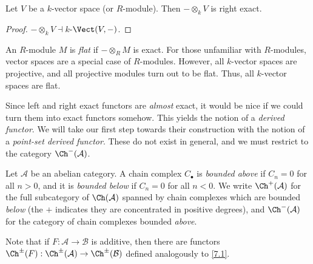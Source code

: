 \begin{corollary}\label{7.8}
	Let $V$ be a $k$-vector space (or $R$-module). Then $-\otimes_kV$ is right exact.
\end{corollary}
\begin{proof}
	$-\otimes_k V \dashv k$-$\Vect(V,-)$.
\end{proof}

\begin{remark}\label{7.9}
	An $R$-module $M$ is \emph{flat} if $-\otimes_RM$ is exact. For those unfamiliar with $R$-modules, vector spaces are a special case of $R$-modules. However, all $k$-vector spaces are projective, and all projective modules turn out to be flat. Thus, all $k$-vector spaces are flat.
\end{remark}

Since left and right exact functors are \emph{almost} exact, it would be nice if we could turn them into exact functors somehow. This yields the notion of a \emph{derived functor}. We will take our first step towards their construction with the notion of a \emph{point-set derived functor}. These do not exist in general, and we must restrict to the category $\Ch^-(\mathcal{A} ) $.

\begin{definition}\label{7.10}
	Let $\mathcal{A} $ be an abelian category. A chain complex $C_{\bullet} $ is \emph{bounded above} if $C_n=0$ for all $n>0$, and it is \emph{bounded below} if $C_n=0$ for all $n<0$. We write $\Ch^+(\mathcal{A} ) $ for the full subcategory of $\Ch(\mathcal{A} ) $ spanned by chain complexes which are bounded \emph{below} (the $+$ indicates they are concentrated in positive degrees), and $\Ch^-(\mathcal{A} ) $ for the category of chain complexes bounded \emph{above}.
\end{definition}

Note that if $F : \mathcal{A}  \to \mathcal{B} $ is additive, then there are functors $\Ch^\pm(F) : \Ch^\pm(\mathcal{A} )  \to \Ch^\pm(\mathcal{B} ) $ defined analogously to \cref{7.1}.

